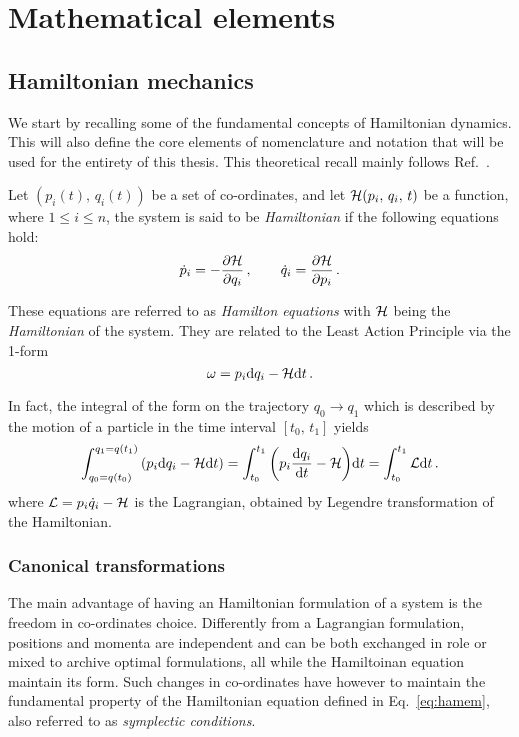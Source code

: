 
\chapter{Mathematical elements}\label{ch:mathematical_elements}

\section{Hamiltonian mechanics}\label{sec:1:hamiltonian}

We start by recalling some of the fundamental concepts of Hamiltonian dynamics. This will also define the core elements of nomenclature and notation that will be used for the entirety of this thesis. This theoretical recall mainly follows Ref.~\cite{Arnold:937549}.

Let $(p_i(t),\,q_i(t))$ be a set of co-ordinates, and let $\mathcal{H}(p_i,\, q_i,\, t)$ be a function, where $1\le i \le n$, the system is said to be \textit{Hamiltonian} if the following equations hold:
%
\begin{equation} 
		\dot p_i = -\pdv{\mathcal{H}}{q_i}\,,\qquad 		\dot q_i = \pdv{\mathcal{H}}{p_i} \, .
	\label{hameq}
 \end{equation} 

These equations are referred to as \textit{Hamilton equations} with $\mathcal{H}$ being the \textit{Hamiltonian} of the system. They are related to the Least Action Principle via the 1-form
%
\begin{equation} \omega = p_i \dd q_i -\mathcal{H} \dd t \, .  \end{equation}

In fact, the integral of the form on the trajectory $q_0\to q_1$ which is described by the motion of a particle in the time interval $[t_0,\,t_1]$ yields
%
\begin{equation}\int_{q_0=q(t_0)}^{q_1=q(t_1)} \qty(p_i \dd q_i - \mathcal{H} \dd t) = \int_{t_0}^{t_1} \qty(p_i \dv{q_i}{t} - \mathcal{H})\dd t =  \int_{t_0}^{t_1} \mathcal{L} \dd t\,. \end{equation}
%
where $\mathcal{L}=p_i\dot q_i - \mathcal{H}$ is the Lagrangian, obtained by Legendre transformation of the Hamiltonian. 

\subsection{Canonical transformations}

The main advantage of having an Hamiltonian formulation of a system is the freedom in co-ordinates choice. Differently from a Lagrangian formulation, positions and momenta are independent and can be both exchanged in role or mixed to archive optimal formulations, all while the Hamiltoinan equation maintain its form. Such changes in co-ordinates have however to maintain the fundamental property of the Hamiltonian equation defined in Eq.~\eqref{eq:hamem}, also referred to as \textit{symplectic conditions}.

